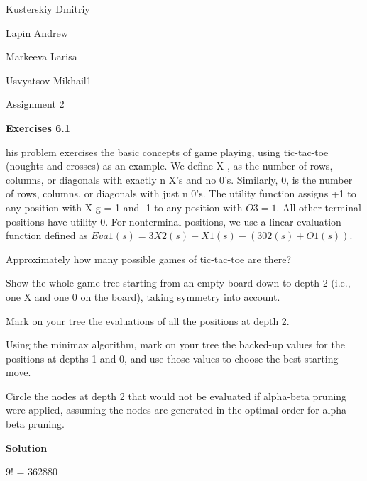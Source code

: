 \documentclass[12pt]{article}
\theoremstyle{definiton}
\theoremstyle{definition}
\theoremstyle{definition}
\newcounter{problem}
\begin{document}
	Kusterskiy Dmitriy
	
	Lapin Andrew

	Markeeva Larisa

	Usvyatsov Mikhail1
	
	
	\centerline{\LARGE Assignment 2}

	\bigskip
	
		\textbf{Exercises 6.1}
		
		his problem exercises the basic concepts of game playing, using tic-tac-toe (noughts and crosses) as an example. We define X , as the number of rows, columns, or diagonals with exactly n X's and no 0's. Similarly, 0, is the number of rows, columns, or diagonals with just n 0's. The utility function assigns +1 to any position with X g = 1 and -1 to any position with $O3 = 1$. All other terminal positions have utility 0. For nonterminal positions, we use a linear evaluation function defined as $Eva1 ( s ) = 3X2 (s) +X1 (s) - ( 302 (s) +O1(s))$. 
		
\begin{list}{) ~}{}
\item Approximately how many possible games of tic-tac-toe are there?
\item Show the whole game tree starting from an empty board down to depth 2 (i.e., one X and one 0 on the board), taking symmetry into account.
\item Mark on your tree the evaluations of all the positions at depth 2.
\item Using the minimax algorithm, mark on your tree the backed-up values for the positions
at depths 1 and 0, and use those values to choose the best starting move.
\item Circle the nodes at depth 2 that would not be evaluated if alpha-beta pruning were
applied, assuming the nodes are generated in the optimal order for alpha-beta pruning.
\end{list}
		\medskip
		
		\textbf{Solution}
\begin{list}{) ~}{}
\item  9! = 362880
\item
\item
\item
\item
\end{list}
\end{document}
